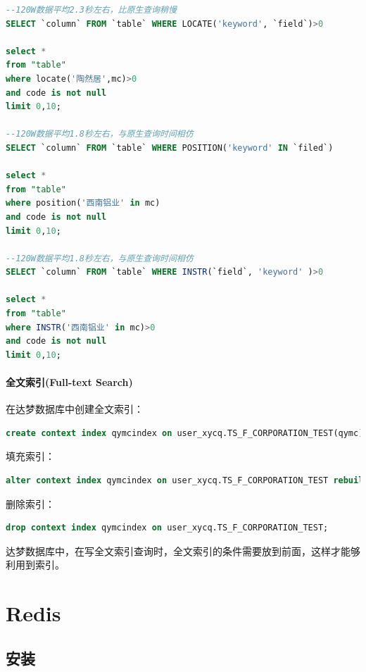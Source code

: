 \documentclass[letter]{book}
\begin{document}
\begin{lstlisting}[language=SQL]
--120W数据平均2.3秒左右，比原生查询稍慢
SELECT `column` FROM `table` WHERE LOCATE('keyword', `field`)>0

select * 
from "table" 
where locate('陶然居',mc)>0
and code is not null
limit 0,10;

--120W数据平均1.8秒左右，与原生查询时间相仿
SELECT `column` FROM `table` WHERE POSITION('keyword' IN `filed`)

select * 
from "table" 
where position('西南铝业' in mc)
and code is not null
limit 0,10;

--120W数据平均1.8秒左右，与原生查询时间相仿
SELECT `column` FROM `table` WHERE INSTR(`field`, 'keyword' )>0

select * 
from "table" 
where INSTR('西南铝业' in mc)>0
and code is not null
limit 0,10;
\end{lstlisting}

\paragraph{全文索引(Full-text Search)}

在达梦数据库中创建全文索引：

\begin{lstlisting}[language=SQL]
create context index qymcindex on user_xycq.TS_F_CORPORATION_TEST(qymc) lexer CHINESE_VGRAM_LEXER;
\end{lstlisting}

填充索引：

\begin{lstlisting}[language=SQL]
alter context index qymcindex on user_xycq.TS_F_CORPORATION_TEST rebuild;
\end{lstlisting}

删除索引：

\begin{lstlisting}[language=SQL]
drop context index qymcindex on user_xycq.TS_F_CORPORATION_TEST;
\end{lstlisting}

达梦数据库中，在写全文索引查询时，全文索引的条件需要放到前面，这样才能够利用到索引。

\section{Redis}

\subsection{安装}
\end{document}

